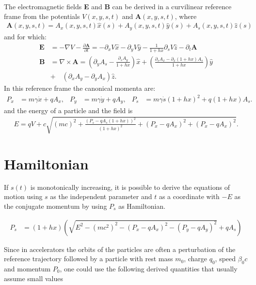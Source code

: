 \documentclass[english]{article}
\begin{document}
The electromagnetic fields {\bf E} and {\bf B} can be derived in a curvilinear
reference frame from the potentials $V(x,y,s,t)$ and $\mathbf{A}(x,y,s,t)$, where
\begin{align}
\mathbf{A}(x,y,s,t)=A_x(x,y,s,t) \hat x(s) + A_y(x,y,s,t) \hat y(s) + A_s(x,y,s,t) \hat z(s)
\end{align}
and for which:
\begin{align}
  \mathbf{E}  &= -\nabla V - \frac{\partial \mathbf{A}}{\partial t} 
               = -\partial_x V \hat x - \partial_y V \hat y -
  \frac{1}{1+h x}  \partial_s V \hat z - \partial_t \mathbf{A}\\
  \mathbf{B} &= \nabla\times\mathbf{A}  =
  \left(\partial_y A_s - \frac{\partial_s  A_y}{1+h x} \right) \hat x 
  +\left(\frac{\partial_s A_x-\partial_x (1+h x) A_s }{1+h x} \right)\hat y \\
  &+\quad \left(\partial_x A_y - \partial_y A_x \right) \hat z.
\end{align}
In this reference frame the canonical momenta are:
\begin{align}
  P_x&=m \gamma \dot x + q A_x, &
  P_y&=m \gamma \dot y + q A_y, &
  P_s&=m \gamma \dot s (1 + h x)^2 + q (1 + h x) A_s.
\end{align}
and the energy of a particle and the field is
\begin{align}
E=qV + c \sqrt{(mc)^2
              +\frac{(P_s- q A_s(1+hx))^2}{(1+hx)^2}
              +(P_x-q A_x)^2 + (P_x-q A_x)^2}.
\end{align}







\section{Hamiltonian}

If $s(t)$ is monotonically increasing, it is possible to derive the equations
of motion using $s$ as the independent parameter and $t$ as a coordinate with
$-E$ as the conjugate momentum by using $P_s$ as Hamiltonian.

\begin{align}
  P_s&= (1+h x) \left( 
       \sqrt{ E^2 - (mc^2)^2
           - (P_x - q A_x)^2
           - (P_y - q A_y)^2}
       +q A_s
    \right)
\end{align}

Since in accelerators the orbits of the 
particles are often a perturbation of the reference trajectory followed by a
particle with rest mass $m_0$, charge $q_0$, speed $\beta_0 c$ and momentum
$P_0$, one could use the following derived quantities that usually assume small
values
\end{document}
